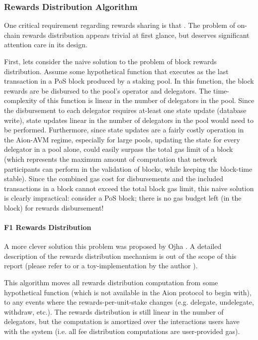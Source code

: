 \subsubsection{Rewards Distribution Algorithm} \label{f1-rewards}

One critical requirement regarding rewards sharing is that . The problem of on-chain rewards distribution appears trivial at first glance, but deserves significant attention care in its design.  

First, lets consider the naive solution to the problem of block rewards distribution. Assume some hypothetical  function that executes as the last transaction in a PoS block produced by a staking pool. In this function, the block rewards are be disbursed to the pool's operator and delegators. The time-complexity of this function is linear in the number of delegators in the pool. Since the disbursement to each delegator requires at-least one state update (database write), state updates linear in the number of delegators in the pool would need to be performed. Furthermore, since state updates are a fairly costly operation in the Aion-AVM regime, especially for large pools, updating the state for every delegator in a pool alone, could easily surpass the total gas limit of a block (which represents the maximum amount of computation that network participants can perform in the validation of blocks, while keeping the block-time stable). Since the combined gas cost for disbursements and the included transactions in a block cannot exceed the total block gas limit, this naive solution is clearly impractical: consider a  PoS block; there is no gas budget left (in the block) for rewards disbursement!  

\paragraph{F1 Rewards Distribution} A more clever solution this problem was proposed by Ojha \cite{Ojh19}. A detailed description of the rewards distribution mechanism is out of the scope of this report (please refer to \cite{Ojh19} or a toy-implementation by the author \cite{Sha19}). 

This algorithm moves all rewards distribution computation from some hypothetical  function (which is not available in the Aion protocol to begin with), to any events where the rewards-per-unit-stake changes (e.g. delegate, undelegate, withdraw, etc.). The rewards distribution is still linear in the number of delegators, but the computation is amortized over the interactions users have with the system (i.e. all fee distribution computations are  user-provided gas).   

